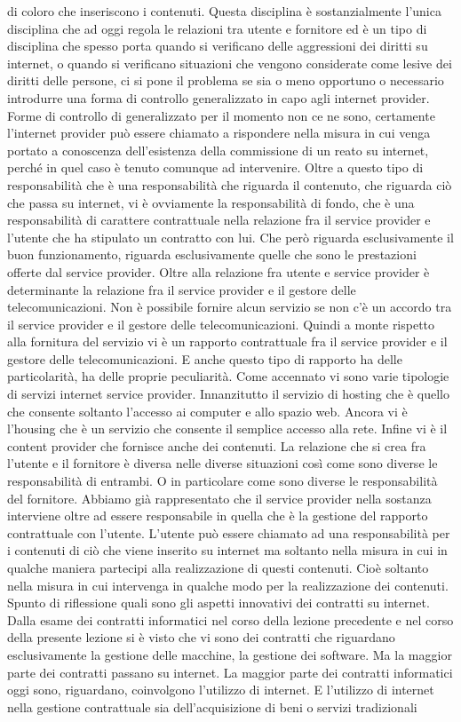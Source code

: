 di coloro che inseriscono i contenuti. Questa disciplina è sostanzialmente l'unica disciplina che ad oggi regola le relazioni tra utente e fornitore ed è un tipo di disciplina che spesso porta quando si verificano delle aggressioni dei diritti su internet, o quando si verificano situazioni che vengono considerate come lesive dei diritti delle persone, ci si pone il problema se sia o meno opportuno o necessario introdurre una forma di controllo generalizzato in capo agli internet provider. Forme di controllo di generalizzato per il momento non ce ne sono, certamente l'internet provider può essere chiamato a rispondere nella misura in cui venga portato a conoscenza dell'esistenza della commissione di un reato su internet, perché in quel caso è tenuto comunque ad intervenire. Oltre a questo tipo di responsabilità che è una responsabilità che riguarda il contenuto, che riguarda ciò che passa su internet, vi è ovviamente la responsabilità di fondo, che è una responsabilità di carattere contrattuale nella relazione fra il service provider e l'utente che ha stipulato un contratto con lui. Che però riguarda esclusivamente il buon funzionamento, riguarda esclusivamente quelle che sono le prestazioni offerte dal service provider. Oltre alla relazione fra utente e service provider è determinante la relazione fra il service provider e il gestore delle telecomunicazioni. Non è possibile fornire alcun servizio se non c'è un accordo tra il service provider e il gestore delle telecomunicazioni. Quindi a monte rispetto alla fornitura del servizio vi è un rapporto contrattuale fra il service provider e il gestore delle telecomunicazioni. E anche questo tipo di rapporto ha delle particolarità, ha delle proprie peculiarità. Come accennato vi sono varie tipologie di servizi internet service provider. Innanzitutto il servizio di hosting che è quello che consente soltanto l'accesso ai computer e allo spazio web. Ancora vi è l'housing che è un servizio che consente il semplice accesso alla rete. Infine vi è il content provider che fornisce anche dei contenuti. La relazione che si crea fra l'utente e il fornitore è diversa nelle diverse situazioni così come sono diverse le responsabilità di entrambi. O in particolare come sono diverse le responsabilità del fornitore. Abbiamo già rappresentato che il service provider nella sostanza interviene oltre ad essere responsabile in quella che è la gestione del rapporto contrattuale con l'utente. L'utente può essere chiamato ad una responsabilità per i contenuti di ciò che viene inserito su internet ma soltanto nella misura in cui in qualche maniera partecipi alla realizzazione di questi contenuti. Cioè soltanto nella misura in cui intervenga in qualche modo per la realizzazione dei contenuti. Spunto di riflessione quali sono gli aspetti innovativi dei contratti su internet. Dalla esame dei contratti informatici nel corso della lezione precedente e nel corso della presente lezione si è visto che vi sono dei contratti che riguardano esclusivamente la gestione delle macchine, la gestione dei software. Ma la maggior parte dei contratti passano su internet. La maggior parte dei contratti informatici oggi sono, riguardano, coinvolgono l'utilizzo di internet. E l'utilizzo di internet nella gestione contrattuale sia dell'acquisizione di beni o servizi tradizionali 